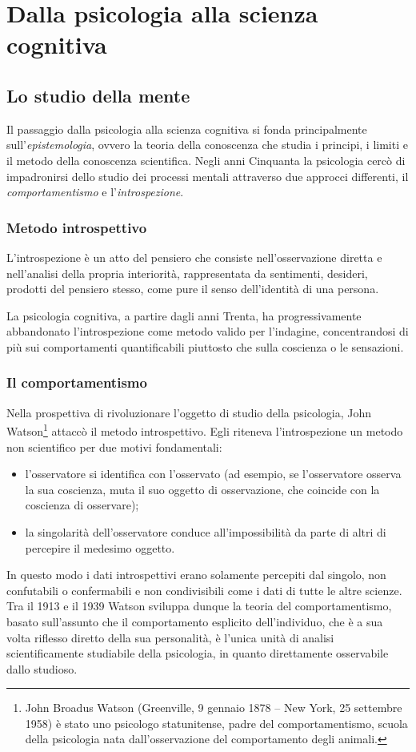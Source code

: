 \chapter{Dalla psicologia alla scienza cognitiva}
\section{Lo studio della mente}
Il passaggio dalla psicologia alla scienza cognitiva si fonda principalmente sull’\emph{epistemologia}, ovvero la teoria della conoscenza che studia i principi, i limiti e il metodo della conoscenza scientifica. Negli anni Cinquanta la psicologia cercò di impadronirsi dello studio dei processi mentali attraverso due approcci differenti, il \emph{comportamentismo} e l'\emph{introspezione}.

\subsection{Metodo introspettivo}
L'introspezione è un atto del pensiero che consiste nell'osservazione diretta e nell'analisi della propria interiorità, rappresentata da sentimenti, desideri, prodotti del pensiero stesso, come pure il senso dell'identità di una persona.

La psicologia cognitiva, a partire dagli anni Trenta, ha progressivamente abbandonato l'introspezione come metodo valido per l'indagine, concentrandosi di più sui comportamenti quantificabili piuttosto che sulla coscienza o le sensazioni.

\subsection{Il comportamentismo}
Nella prospettiva di rivoluzionare l'oggetto di studio della psicologia, John Watson\footnote{John Broadus Watson (Greenville, 9 gennaio 1878 – New York, 25 settembre 1958) è stato uno psicologo statunitense, padre del comportamentismo, scuola della psicologia nata dall'osservazione del comportamento degli animali.} attaccò il metodo introspettivo. Egli riteneva l'introspezione un metodo non scientifico per due motivi fondamentali:
\begin{itemize}
  \item l'osservatore si identifica con l'osservato (ad esempio, se l'osservatore osserva la sua coscienza, muta il suo oggetto di osservazione, che coincide con la coscienza di osservare);
  \item la singolarità dell'osservatore conduce all'impossibilità da parte di altri di percepire il medesimo oggetto.
\end{itemize}
In questo modo i dati introspettivi erano solamente percepiti dal singolo, non confutabili o confermabili e non condivisibili come i dati di tutte le altre scienze. Tra il 1913 e il 1939 Watson sviluppa dunque la teoria del comportamentismo, basato sull'assunto che il comportamento esplicito dell'individuo, che è a sua volta riflesso diretto della sua personalità, è l'unica unità di analisi scientificamente studiabile della psicologia, in quanto direttamente osservabile dallo studioso.

